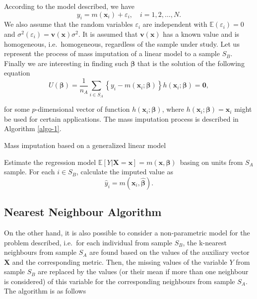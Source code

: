 \documentclass[
]{jss}
\begin{document}
According to the model described, we have \[
y_i=m\left(\boldsymbol{x}_i\right)+\varepsilon_i, \quad i=1,2, \ldots, N.
\] We also assume that the random variables \(\varepsilon_i\) are
independent with \(\mathbb{E} \left(\varepsilon_i \right) = 0\) and
\(\sigma^2 \left(\varepsilon_i \right) = \mathbf{v} \left(\boldsymbol{x}\right) \sigma^2\).
It is assumed that \(\mathbf{v} \left(\boldsymbol{x}\right)\) has a
known value and is homogeneous, i.e.~homogeneous, regardless of the
sample under study. Let us represent the process of mass imputation of a
linear model to a sample \(S_B\). Finally we are interesting in finding
such \(\boldsymbol{\beta}\) that is the solution of the following
equation \begin{equation}
\label{eq-2.3}
U(\boldsymbol{\beta})=\frac{1}{n_A} \sum_{i \in S_A}\left\{y_i-m\left(\boldsymbol{x}_i ; \boldsymbol{\beta}\right)\right\} h\left(\boldsymbol{x}_i ; \boldsymbol{\beta}\right)=\mathbf{0},
\end{equation}

for some \(p\)-dimensional vector of function
\(h\left(\boldsymbol{x}_i ; \boldsymbol{\beta}\right)\), where
\(h\left(\boldsymbol{x}_i ; \boldsymbol{\beta}\right) = \boldsymbol{x}_i\)
might be used for certain applications. The mass imputation process is
described in Algorithm \ref{algo-1}.

\begin{algorithm}[H]
\caption{Mass imputation based on a generalized linear model}
\label{algo-1}
\begin{algorithmic}[1]
 \State Estimate the regression model $\mathbb{E}[Y|\boldsymbol{X}=\boldsymbol{x}]=m(\boldsymbol{x}, \boldsymbol{\beta})$\ basing on units from $S_A$ sample.
 \State For each $i \in S_B$, calculate the imputed value as
 $$
 \hat{y}_i = m\left(\boldsymbol{x}_{i},\hat{\boldsymbol{\beta}}\right).
 $$
\end{algorithmic}
\end{algorithm}

\hypertarget{nearest-neighbour-algorithm}{%
\subsection{Nearest Neighbour
Algorithm}\label{nearest-neighbour-algorithm}}

On the other hand, it is also possible to consider a non-parametric
model for the problem described, i.e.~for each individual from sample
\(S_B\), the k-nearest neighbours from sample \(S_A\) are found based on
the values of the auxiliary vector \(\boldsymbol{X}\) and the
corresponding metric. Then, the missing values of the variable \(Y\)
from sample \(S_B\) are replaced by the values (or their mean if more
than one neighbour is considered) of this variable for the corresponding
neighbours from sample \(S_A\). The algorithm is as follows
\end{document}
